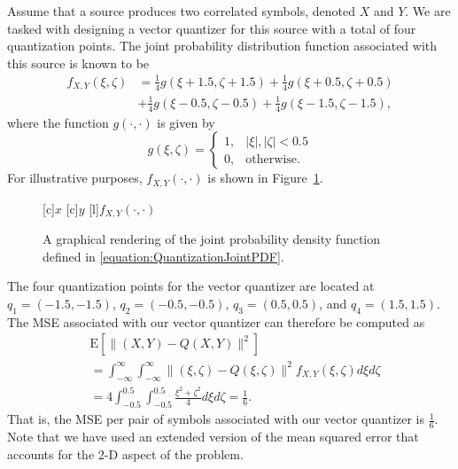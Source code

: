 \begin{example} \label{example:VectorQuantization}
Assume that a source produces two correlated symbols, denoted $X$ and $Y$.
We are tasked with designing a vector quantizer for this source with a total of four quantization points.
The joint probability distribution function associated with this source is known to be
\begin{equation} \label{equation:QuantizationJointPDF}
\begin{split}
f_{X,Y} (\xi, \zeta) &= \frac{1}{4} g ( \xi + 1.5, \zeta + 1.5 )
+ \frac{1}{4} g ( \xi + 0.5, \zeta + 0.5 ) \\
&+ \frac{1}{4} g ( \xi - 0.5, \zeta - 0.5 )
+ \frac{1}{4} g ( \xi - 1.5, \zeta - 1.5 ) ,
\end{split}
\end{equation}
where the function $g(\cdot, \cdot)$ is given by
\begin{equation*}
g(\xi, \zeta) = \begin{cases} 1, &  |\xi|, |\zeta| < 0.5 \\
0, & \text{otherwise}. \end{cases}
\end{equation*}
For illustrative purposes, $f_{X,Y} (\cdot, \cdot)$ is shown in Figure~\ref{figure:VectorQuantization}.
\begin{figure}[htbp]
\begin{center}
\begin{psfrags}
[c]{$x$}
[c]{$y$}
[l]{$f_{X,Y}(\cdot, \cdot)$}
\end{psfrags}
\caption{A graphical rendering of the joint probability density function defined in \eqref{equation:QuantizationJointPDF}.}
\label{figure:VectorQuantization}
\end{center}
\end{figure}
The four quantization points for the vector quantizer are located at $q_1 = (-1.5, -1.5)$, $q_2 = (-0.5, -0.5)$, $q_3 = (0.5, 0.5)$, and $q_4 = (1.5, 1.5)$.
The MSE associated with our vector quantizer can therefore be computed as
\begin{equation*}
\begin{split}
&\mathrm{E} \left[ \| (X,Y) - Q(X,Y) \|^2 \right] \\
&= \int_{-\infty}^{\infty} \int_{-\infty}^{\infty}
\| (\xi, \zeta) - Q(\xi, \zeta) \|^2 f_{X,Y}(\xi,\zeta) d\xi d\zeta \\
&= 4 \int_{-0.5}^{0.5} \int_{-0.5}^{0.5} \frac{\xi^2 + \zeta^2}{4} d\xi d\zeta
= \frac{1}{6} .
\end{split}
\end{equation*}
That is, the MSE per pair of symbols associated with our vector quantizer is $\frac{1}{6}$.
Note that we have used an extended version of the mean squared error that accounts for the 2-D aspect of the problem.


\end{example}
